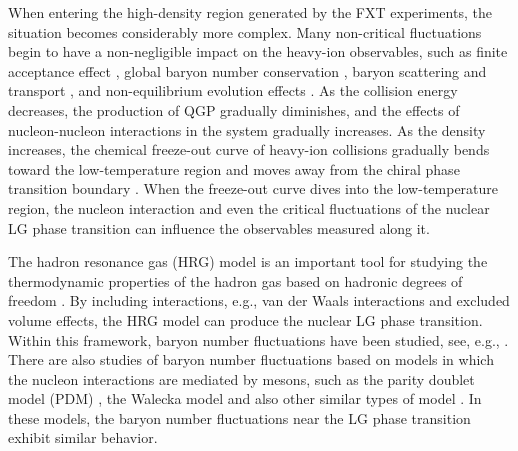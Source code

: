 \documentclass[aps,twocolumn,prd,superscriptaddress,nofootinbib,floatfix]{revtex4-2}
\begin{document}
When entering the high-density region generated by the FXT experiments, the situation becomes considerably more complex. Many non-critical fluctuations begin to have a non-negligible impact on the heavy-ion observables, such as finite acceptance effect \cite{Zhang:2019lqz}, global baryon number conservation \cite{Braun-Munzinger:2020jbk,Fu:2023lcm,Vovchenko:2020tsr,Vovchenko:2021yen,Poberezhniuk:2026bfv,Li:2023kja,Li:2026tcq}, baryon scattering and transport \cite{Chen:2024zry,Lin:2026bso}, and non-equilibrium evolution effects \cite{Berdnikov:1999ph,Mukherjee:2016kyu,Tan:2025bsv}. As the collision energy decreases, the production of QGP gradually diminishes, and the effects of nucleon-nucleon interactions in the system gradually increases. As the density increases, the chemical freeze-out curve of heavy-ion collisions gradually bends toward the low-temperature region and moves away from the chiral phase transition boundary \cite{Fu:2021oaw,Andronic:2017pug,Lu:2026ezr}. When the freeze-out curve dives into the low-temperature region, the nucleon interaction and even the critical fluctuations of the nuclear LG phase transition can influence the observables measured along it.

The hadron resonance gas (HRG) model is an important tool for studying the thermodynamic properties of the hadron gas based on hadronic degrees of freedom \cite{Karsch:2003zq,Huovinen:2009yb,Vovchenko:2019pjl}. By including interactions, e.g., van der Waals interactions and excluded volume effects, the HRG model can produce the nuclear LG phase transition. Within this framework, baryon number fluctuations have been studied, see, e.g., \cite{Vovchenko:2016rkn,Poberezhnyuk:2019pxs,Vovchenko:2017cbu,Samanta:2017yhh}. There are also studies of baryon number fluctuations based on models in which the nucleon interactions are mediated by mesons, such as the parity doublet model (PDM) \cite{Koch:2023oez,Mukherjee:2016nhb,Marczenko:2025kpv}, the Walecka model \cite{Yang:2023gfy,Shao:2020lsv} and also other similar types of model \cite{Marczenko:2017huu,Fukushima:2014lfa}. In these models, the baryon number fluctuations near the LG phase transition exhibit similar behavior. 
\end{document}
